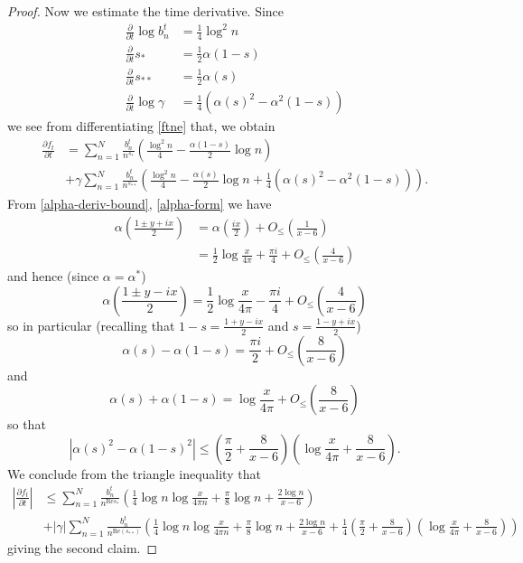 \begin{proof}
Now we estimate the time derivative.  Since
\begin{align*}
 \frac{\partial}{\partial t} \log b_n^t &= \frac{1}{4} \log^2 n \\
 \frac{\partial}{\partial t} s_* &= \frac{1}{2} \alpha(1-s) \\
 \frac{\partial}{\partial t} s_{**} &= \frac{1}{2} \alpha(s) \\
 \frac{\partial}{\partial t} \log \gamma &= \frac{1}{4} \left(\alpha(s)^2 - \alpha^2(1-s)\right)
\end{align*}
we see from differentiating \eqref{ftne} that, we obtain
\begin{align*}
 \frac{\partial f_t}{\partial t} &= \sum_{n=1}^N \frac{b_n^t}{n^{s_*}} \left(\frac{\log^2 n}{4} - \frac{\alpha(1-s)}{2} \log n\right) \\
&+ \gamma \sum_{n=1}^N \frac{b_n^t}{n^{s_{**}}}
\left(\frac{\log^2 n}{4} - \frac{\alpha(s)}{2} \log n + \frac{1}{4} (\alpha(s)^2 - \alpha^2(1-s))\right).
\end{align*}
From \eqref{alpha-deriv-bound}, \eqref{alpha-form} we have
\begin{align*}
 \alpha\left(\frac{1 \pm y+ix}{2}\right) &= \alpha\left(\frac{ix}{2}\right) + O_{\leq}\left( \frac{1}{x-6} \right) \\
&= \frac{1}{2} \log \frac{x}{4\pi} + \frac{\pi i}{4} + O_{\leq}\left( \frac{4}{x-6} \right) 
\end{align*}
and hence (since $\alpha = \alpha^*$)
$$ \alpha\left(\frac{1 \pm y-ix}{2}\right) = \frac{1}{2} \log \frac{x}{4\pi} - \frac{\pi i}{4} + O_{\leq}\left( \frac{4}{x-6} \right) $$
so in particular (recalling that $1-s = \frac{1+y-ix}{2}$ and $s = \frac{1-y+ix}{2}$)
$$ \alpha(s) - \alpha(1-s) = \frac{\pi i}{2} + O_{\leq}\left( \frac{8}{x-6} \right)$$
and
$$ \alpha(s) + \alpha(1-s) = \log \frac{x}{4\pi} + O_{\leq}\left( \frac{8}{x-6} \right)$$
so that
$$ \left|\alpha(s)^2 - \alpha(1-s)^2\right| \leq \left(\frac{\pi}{2} + \frac{8}{x-6}\right) \left(\log \frac{x}{4\pi} + \frac{8}{x-6}\right).$$
We conclude from the triangle inequality that
\begin{align*}
 \left|\frac{\partial f_t}{\partial t}\right| &\leq \sum_{n=1}^N \frac{b_n^t}{n^{\mathrm{Re} s_*}} \left(\frac{1}{4} \log n \log \frac{x}{4\pi n} + \frac{\pi}{8} \log n + \frac{2 \log n}{x-6}\right) \\
&+ |\gamma| \sum_{n=1}^N \frac{b_n^t}{n^{\mathrm{Re}(s_{**})}}
\left(\frac{1}{4} \log n \log \frac{x}{4\pi n} + \frac{\pi}{8} \log n + \frac{2 \log n}{x-6} + \frac{1}{4} \left(\frac{\pi}{2} + \frac{8}{x-6}\right) \left(\log \frac{x}{4\pi} + \frac{8}{x-6}\right)\right)
\end{align*}
giving the second claim.
\end{proof}

